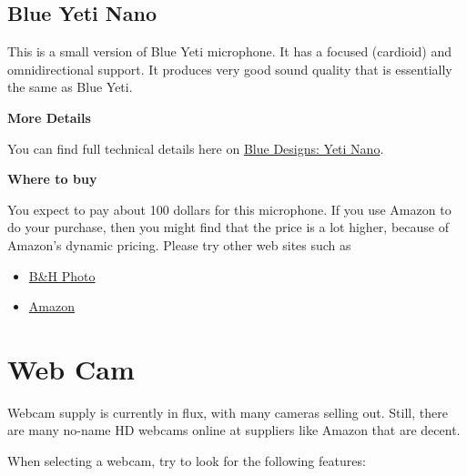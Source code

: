 \begin{gram}
\end{gram}

\subsection{Blue Yeti Nano}
\label{sec:equipment::blueyetinano}

\begin{gram}
\label{grm:equipment::blueyetinano::main}
%
This is a small version of Blue Yeti microphone.
%
It has a focused (cardioid) and omnidirectional support.
%
It produces very good sound quality that is essentially the same as Blue Yeti.


\textbf{More Details}

You can find full technical details here on \href{https://www.bluedesigns.com/products/yeti-nano/}{Blue Designs: Yeti Nano}.


\textbf{Where to buy}

You expect to pay about 100 dollars for this microphone.  If you use Amazon to do your purchase, then you might find that the price is a lot higher, because of Amazon's dynamic pricing.  Please try other web sites such as 

\begin{itemize}
\item
\href{https://www.bhphotovideo.com/c/l-search?q=Blue%20Yeti%20Nano&N=0}{B\&H Photo}
\item 
\href{https://www.amazon.com/Blue-Yeti-Premium-Recording-Streaming/dp/B07DTTGZ7M}{Amazon}
\end{itemize}
\end{gram}

\begin{gram}
\end{gram}

\section{Web Cam}
\label{sec:equipment::web-cam}
Webcam supply is currently in flux, with many cameras selling out. 
Still, there are many no-name HD webcams online at suppliers like Amazon that are decent.

When selecting a webcam, try to look for the following features:

